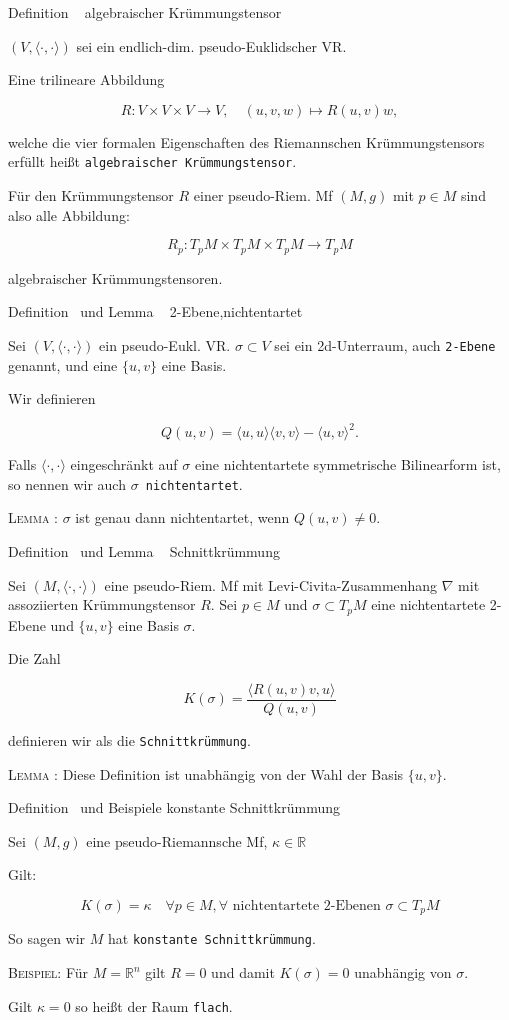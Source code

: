 \documentclass[a6paper,11pt,grid=front]{kartei}
\newcommand{\fl}[1]{\begin{flushleft}
 #1 \end{flushleft}}
\newcommand{\R}{\mathbb{R}}
\newcommand{\blf}[1]{\langle #1 \rangle}
\newcounter{def}
\newcounter{satz}
\newcommand{\defreset}{\setcounter{def}{1}}
\newcommand{\satzreset}{\setcounter{satz}{1}}
\newcommand{\thisdef}{\thedef\ \stepcounter{def}}
\newcommand{\thissatz}{\thesatz\ \stepcounter{satz}}
\begin{document}
\nonameyet
{Definition \thisdef} {algebraischer Krümmungstensor}
{
\small
$(V,\blf{\cdot,\cdot})$ sei ein endlich-dim. pseudo-Euklidscher VR.
\fl{Eine trilineare Abbildung}
\[
R: V\times V\times V\to V, \quad (u,v,w) \mapsto R(u,v)w,
\]
\fl{welche die vier formalen Eigenschaften des Riemannschen Krümmungstensors
erfüllt heißt \texttt{algebraischer Krümmungstensor}.}
\fl{Für den Krümmungstensor $R$ einer pseudo-Riem. Mf $(M,g)$ mit $p\in M$ sind 
also alle Abbildung:}
\[
R_p : T_pM \times T_pM \times T_pM \to T_pM 
\]
\fl{algebraischer Krümmungstensoren.}
}
{}
\defreset
\satzreset
{}

\nonameyet
{Definition \thisdef und Lemma \thissatz} {2-Ebene,\small nichtentartet}
{
Sei $(V,\blf{\cdot,\cdot})$ ein pseudo-Eukl. VR. $\sigma \subset V$ sei
ein 2d-Unterraum, auch \texttt{2-Ebene} genannt,  und eine $\{u,v\}$ eine Basis.
\fl{Wir definieren}
\[
Q(u,v) = \blf{u,u}\blf{v,v} - \blf{u,v}^2.
\]
\fl{Falls $\blf{\cdot,\cdot}$ eingeschränkt auf $\sigma$ eine nichtentartete
symmetrische Bilinearform ist, so nennen wir auch \texttt{$\sigma$ 
nichtentartet}.} 
\fl{\textsc{Lemma \thesatz:} $\sigma$ ist genau dann nichtentartet, wenn 
$Q(u,v) \neq 0$.}
}
{}

\nonameyet
{\scriptsize Definition \thisdef und Lemma \thissatz} {\scriptsize Schnittkrümmung}
{
\small
Sei $(M,\blf{\cdot,\cdot})$ eine pseudo-Riem. Mf mit Levi-Civita-Zusammenhang
$\nabla$ mit assoziierten Krümmungstensor $R$. 
Sei $p\in M$ und $\sigma \subset T_pM$ eine nichtentartete 2-Ebene und 
$\{u,v\}$ eine Basis $\sigma$.
\fl{Die Zahl}
\[
K(\sigma) = \frac{\blf{R(u,v)v,u}}{Q(u,v)}
\]
\fl{definieren wir als die \texttt{Schnittkrümmung}.}
\fl{\textsc{Lemma \thesatz:} Diese Definition ist unabhängig von der Wahl der Basis
$\{u,v\}$.}
}
{}

\nonameyet
{\scriptsize Definition \thisdef und Beispiele} 
{\scriptsize konstante Schnittkrümmung}
{
Sei $(M,g)$ eine pseudo-Riemannsche Mf, $\kappa \in \R$

\fl{Gilt:}
\[
K(\sigma) = \kappa \quad \forall p\in M, \forall 
\text{ nichtentartete 2-Ebenen } \sigma \subset T_pM
\]
\fl{So sagen wir $M$ hat \texttt{konstante Schnittkrümmung}.}
\fl{\textsc{Beispiel:} Für $M=\R^n$ gilt $R =0$ und damit $K(\sigma) = 0$
unabhängig von $\sigma$.}
\fl{Gilt $\kappa = 0$ so heißt der Raum \texttt{flach}.}
}
{}
\end{document}
